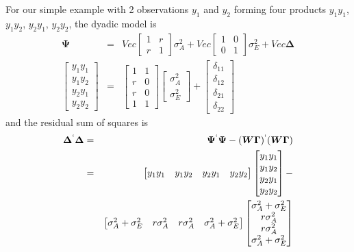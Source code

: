 \documentclass[titlepage,a4paper,12pt]{article}  %
\begin{document}
For our simple example with 2 observations $y_{1}$ and $y_{2}$ forming four products $y_{1}y_{1}$, $y_{1}y_{2}$, $y_{2}y_{1}$, $y_{2}y_{2}$, the dyadic model is 
\begin{eqnarray*}
\bm{\Psi} & = &  Vec \begin{bmatrix} 1 & r \\ r & 1 \end{bmatrix} \sigma^{2}_{A}
         + Vec \begin{bmatrix} 1 & 0 \\ 0 & 1 \end{bmatrix} \sigma^{2}_{E} 
         + Vec \bm{\Delta} \\
 \begin{bmatrix} y_{1}y_{1} \\ y_{1}y_{2} \\ y_{2}y_{1} \\ y_{2}y_{2} \end{bmatrix}          & = & \begin{bmatrix} 1 & 1 \\ r & 0 \\ r & 0 \\ 1 & 1 \end{bmatrix} \begin{bmatrix} \sigma^{2}_{A} \\ \sigma^{2}_{E} \end{bmatrix} +  
  \begin{bmatrix} \delta_{11} \\ \delta_{12} \\ \delta_{21} \\ \delta_{22} \end{bmatrix}
\end{eqnarray*}
 and the residual sum of squares is 
\begin{eqnarray*}
\bm{\Delta}^{`} \bm{\Delta} & = &  \bm{\Psi}^{`}\bm{\Psi} - (\bm{W}\bm{\Gamma})^{`} (\bm{W}\bm{\Gamma}) \\
 & = & \begin{bmatrix} y_{1}y_{1} & y_{1}y_{2} & y_{2}y_{1} & y_{2}y_{2} \end{bmatrix} \begin{bmatrix} y_{1}y_{1} \\ y_{1}y_{2} \\ y_{2}y_{1} \\ y_{2}y_{2} \end{bmatrix} - \\ & &  \begin{bmatrix} \sigma^{2}_{A} + \sigma^{2}_{E} & r \sigma^{2}_{A} & r \sigma^{2}_{A} & \sigma^{2}_{A} + \sigma^{2}_{E} \end{bmatrix}
\begin{bmatrix}\sigma^{2}_{A} + \sigma^{2}_{E} \\ r \sigma^{2}_{A} \\ r \sigma^{2}_{A} \\ \sigma^{2}_{A} + \sigma^{2}_{E} \end{bmatrix} \\
\end{eqnarray*}
\end{document}

